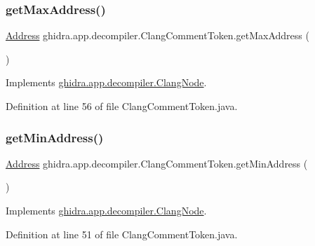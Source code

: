 \subsubsection{\texorpdfstring{getMaxAddress()}{getMaxAddress()}}
{\footnotesize\ttfamily \mbox{\hyperlink{class_address}{Address}} ghidra.\+app.\+decompiler.\+Clang\+Comment\+Token.\+get\+Max\+Address (\begin{DoxyParamCaption}{ }\end{DoxyParamCaption})\hspace{0.3cm}{\ttfamily [inline]}}



Implements \mbox{\hyperlink{interfaceghidra_1_1app_1_1decompiler_1_1_clang_node_a91e8beccce17b875e07d7c0747b43a97}{ghidra.\+app.\+decompiler.\+Clang\+Node}}.



Definition at line 56 of file Clang\+Comment\+Token.\+java.

\mbox{\label{classghidra_1_1app_1_1decompiler_1_1_clang_comment_token_a37ada2eb4a2e4a987ae098096459910a}} 
\subsubsection{\texorpdfstring{getMinAddress()}{getMinAddress()}}
{\footnotesize\ttfamily \mbox{\hyperlink{class_address}{Address}} ghidra.\+app.\+decompiler.\+Clang\+Comment\+Token.\+get\+Min\+Address (\begin{DoxyParamCaption}{ }\end{DoxyParamCaption})\hspace{0.3cm}{\ttfamily [inline]}}



Implements \mbox{\hyperlink{interfaceghidra_1_1app_1_1decompiler_1_1_clang_node_a28f86ac40636cd77392e26367db69dc3}{ghidra.\+app.\+decompiler.\+Clang\+Node}}.



Definition at line 51 of file Clang\+Comment\+Token.\+java.

\mbox{\label{classghidra_1_1app_1_1decompiler_1_1_clang_comment_token_accf25b09504782348ff3a62f3633c89b}} 

